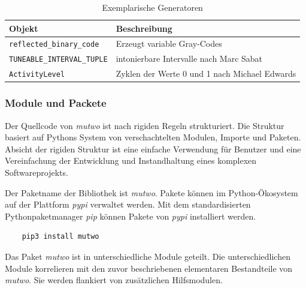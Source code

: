 \documentclass[12pt,a4paper,ngerman]{article}
\begin{document}
\begin{table}[h!]
    \begin{center}
        \begin{tabular}{l l} 
            \hline
            Objekt & Beschreibung \\ [0.5ex] 
            \hline\hline
            \texttt{reflected\_binary\_code} & Erzeugt variable Gray-Codes \\
            \texttt{TUNEABLE\_INTERVAL\_TUPLE} & intonierbare Intervalle nach Marc Sabat \\
            \texttt{ActivityLevel} & Zyklen der Werte 0 und 1 nach Michael Edwards \\ [1ex] 
            \hline
        \end{tabular}
    \end{center}

    \caption{Exemplarische Generatoren}
\end{table}

\subsubsection{Module und Packete}

Der Quellcode von \emph{mutwo} ist nach rigiden Regeln strukturiert.
Die Struktur basiert auf Pythons System von verschachtelten Modulen, Importe und Paketen.
Absicht der rigiden Struktur ist eine einfache Verwendung für Benutzer und eine Vereinfachung der Entwicklung und Instandhaltung eines komplexen Softwareprojekts.

\bigskip

Der Paketname der Bibliothek ist \emph{mutwo}.
Pakete können im Python-Ökosystem auf der Plattform \emph{pypi} verwaltet werden.
Mit dem standardisierten Pythonpaketmanager \emph{pip} können Pakete von \emph{pypi} installiert werden.

\lstset{language=bash}

\begin{lstlisting}
    pip3 install mutwo
\end{lstlisting}

Das Paket \emph{mutwo} ist in unterschiedliche Module geteilt.
Die unterschiedlichen Module korrelieren mit den zuvor beschriebenen elementaren Bestandteile von \emph{mutwo}.
Sie werden flankiert von zusätzlichen Hilfsmodulen.
\end{document}
